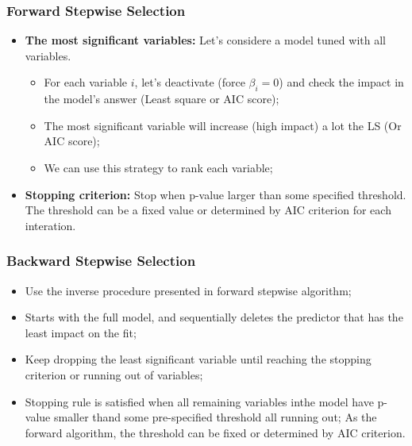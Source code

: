 \begin{frame}
    \frametitle{Forward Stepwise Selection}

    \begin{itemize}

        \item \textbf{The most significant variables:} Let's considere a model tuned with all variables.
        
        \begin{itemize}
            \item For each variable $i$, let's deactivate (force $\beta_i = 0$) and check the impact in the
            model's answer (Least square or AIC score);
            \item The most significant variable will increase (high impact) a lot the LS (Or AIC score);
            \item We can use this strategy to rank each variable;
        \end{itemize}

        \item \textbf{Stopping criterion:} Stop when p-value larger than some specified threshold. The threshold
        can be a fixed value or determined by AIC criterion for each interation.

    \end{itemize}
\end{frame}




\begin{frame}
    \frametitle{Backward Stepwise Selection}

    \begin{itemize}



        \item Use the inverse procedure presented in forward stepwise algorithm;

        \item Starts with the full model, and sequentially deletes the predictor that has the least 
        impact on the fit;
        
        \item Keep dropping the least significant variable until reaching the stopping criterion
        or running out of variables;

        \item Stopping rule is satisfied when all remaining variables inthe model have p-value
        smaller thand some pre-specified threshold all running out; As the forward algorithm, 
        the threshold can be fixed or determined by AIC criterion.

    \end{itemize}
\end{frame}



